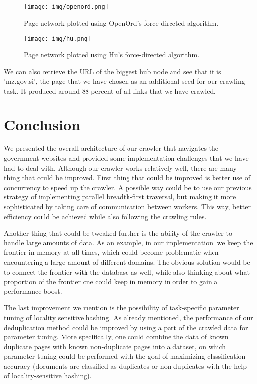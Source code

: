 \documentclass[9pt]{IEEEtran}
\begin{document}
\begin{figure}[h] \centering
    \texttt{[image: img/openord.png]}
    \caption{{Page network plotted using OpenOrd's force-directed algorithm.}}
    \label{fig:openord}
\end{figure}


\begin{figure}[h] \centering
    \texttt{[image: img/hu.png]}
    \caption{{Page network plotted using Hu's force-directed algorithm.}}
    \label{fig:hu}
\end{figure}

We can also retrieve the URL of the biggest hub node and see that it is 'mz.gov.si', the page that we have chosen as an additional seed for our crawling task. It produced around $88$ percent of all links that we have crawled.

\section{Conclusion}\label{sec:Conclusion}
We presented the overall architecture of our crawler that navigates the government websites and provided some implementation challenges that we have had to deal with.
Although our crawler works relatively well, there are many thing that could be improved.
First thing that could be improved is better use of concurrency to speed up the crawler.
A possible way could be to use our previous strategy of implementing parallel breadth-first traversal, but making it more sophisticated by taking care of communication between workers.
This way, better efficiency could be achieved while also following the crawling rules.

Another thing that could be tweaked further is the ability of the crawler to handle large amounts of data.
As an example, in our implementation, we keep the frontier in memory at all times, which could become problematic when encountering a large amount of different domains.
The obvious solution would be to connect the frontier with the database as well, while also thinking about what proportion of the frontier one could keep in memory in order to gain a performance boost.

The last improvement we mention is the possibility of task-specific parameter tuning of locality sensitive hashing.
As already mentioned, the performance of our deduplication method could be improved by using a part of the crawled data for parameter tuning.
More specifically, one could combine the data of known duplicate pages with known non-duplicate pages into a dataset, on which parameter tuning could be performed with the goal of maximizing classification accuracy (documents are classified as duplicates or non-duplicates with the help of locality-sensitive hashing).
 





\end{document}
